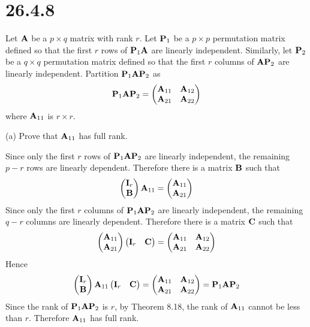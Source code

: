 \section*{26.4.8}
Let $\bf A$ be a $p\times q$ matrix with rank $r$.
Let ${\bf P}_1$ be a $p\times p$ permutation matrix defined so
that the first $r$ rows of ${\bf P}_1{\bf A}$ are linearly
independent.
Similarly, let ${\bf P}_2$ be a $q\times q$ permutation matrix defined
so that the first $r$ columns of ${\bf AP}_2$ are linearly
independent.
Partition ${\bf P}_1{\bf AP}_2$ as
$${\bf P}_1{\bf AP}_2=\left(\begin{matrix}
{\bf A}_{11} & {\bf A}_{12}\cr
{\bf A}_{21} & {\bf A}_{22}
\end{matrix}\right)
$$
where ${\bf A}_{11}$ is $r\times r$.

\bigskip
\noindent
(a) Prove that ${\bf A}_{11}$ has full rank.

\bigskip
\noindent
Since only the first $r$ rows of ${\bf P}_1{\bf A}{\bf P}_2$
are linearly independent, the remaining $p-r$ rows are linearly dependent.
Therefore there is a matrix $\bf B$ such that
$$\left(\begin{matrix}
{\bf I}_r\cr
{\bf B}
\end{matrix}\right){\bf A}_{11}=\left(\begin{matrix}
{\bf A}_{11}\cr
{\bf A}_{21}
\end{matrix}\right)
$$
Since only the first $r$ columns of ${\bf P}_1{\bf A}{\bf P}_2$
are linearly independent, the remaining $q-r$ columns are
linearly dependent.
Therefore there is a matrix $\bf C$ such that
$$\left(\begin{matrix}
{\bf A}_{11}\cr
{\bf A}_{21}
\end{matrix}\right)
\left(\begin{matrix}
{\bf I}_r & {\bf C}
\end{matrix}\right)=\left(\begin{matrix}
{\bf A}_{11} & {\bf A}_{12}\cr
{\bf A}_{21} & {\bf A}_{22}
\end{matrix}\right)
$$
Hence
$$
\left(\begin{matrix}
{\bf I}_r\cr
{\bf B}
\end{matrix}\right){\bf A}_{11}
\left(\begin{matrix}
{\bf I}_r & {\bf C}
\end{matrix}\right)=\left(\begin{matrix}
{\bf A}_{11} & {\bf A}_{12}\cr
{\bf A}_{21} & {\bf A}_{22}
\end{matrix}\right)={\bf P}_1{\bf A}{\bf P}_2
$$
Since the rank of ${\bf P}_1{\bf A}{\bf P}_2$ is $r$,
by Theorem 8.18, the rank of ${\bf A}_{11}$ cannot be less than
$r$. Therefore ${\bf A}_{11}$ has full rank.

